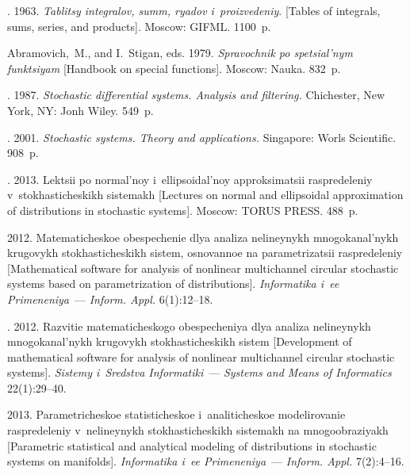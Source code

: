 \begin{multicols}{2}
{{\begin{thebibliography}{99}
.  1963.
\textit{Tablitsy integralov, summ, ryadov i~proizvedeniy}.  [Tables of integrals, sums, series, and products]. Moscow: GIFML.  1100~p.

Abramovich,~M., and I.~Stigan, eds. 1979.
\textit{Spravochnik po spetsial'nym funktsiyam} [Handbook on special functions].  Moscow:  Nauka.  832~p.


.  1987.
\textit{Stochastic differential systems. Analysis and filtering.}   Chichester, New York, NY: Jonh Wiley. 549~p.

. 2001.
\textit{Stochastic systems. Theory and  applications.} Singapore: Worls Scientific. 908~p.

.  2013.
Lektsii po normal'noy i~ellipsoidal'noy approksimatsii raspredeleniy v~stokhasticheskikh sistemakh [Lectures on normal and ellipsoidal
approximation of distributions in stochastic systems]. Moscow: TORUS PRESS. 488~p.





 2012.
Matematicheskoe obespechenie dlya analiza nelineynykh mnogokanal'nykh krugovykh stokhasticheskikh sistem, osnovannoe na parametrizatsii raspredeleniy [Mathematical software for analysis of nonlinear multichannel circular stochastic systems based on parametrization of distributions].
\textit{Informatika i~ee Primeneniya}~---
 \textit{Inform. Appl.} 6(1):12--18.

. 2012.
Razvitie matematicheskogo obespecheniya dlya analiza nelineynykh mno\-go\-ka\-nal'\-nykh krugovykh stokhasticheskikh sistem [Development of mathematical software for analysis of nonlinear multichannel circular stochastic systems]. \textit{Sistemy i~Sredstva Informatiki}~--- \textit{Systems and Means of Informatics} 22(1):29--40.

  2013.
Parametricheskoe statisticheskoe i~analiticheskoe modelirovanie raspredeleniy v~ne\-li\-ney\-nykh stokhasticheskikh sistemakh na mno\-go\-ob\-ra\-zi\-yakh
[Parametric statistical and analytical modeling of distributions in stochastic systems on manifolds]. \textit{Informatika i~ee Primeneniya}~---
 \textit{Inform. Appl.} 7(2):4--16.
\end{thebibliography}

 }
 }

\end{multicols}

